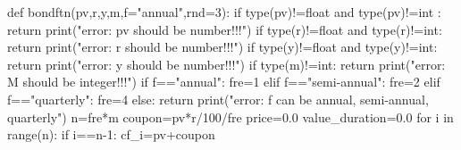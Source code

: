 \documentclass[
  letterpaper,
  DIV=11,
  numbers=noendperiod]{scrreprt}
\newenvironment{Shaded}{\begin{snugshade}}{\end{snugshade}}
\newcommand{\BuiltInTok}[1]{\textcolor[rgb]{0.00,0.23,0.31}{#1}}
\newcommand{\ControlFlowTok}[1]{\textcolor[rgb]{0.00,0.23,0.31}{#1}}
\newcommand{\DecValTok}[1]{\textcolor[rgb]{0.68,0.00,0.00}{#1}}
\newcommand{\FloatTok}[1]{\textcolor[rgb]{0.68,0.00,0.00}{#1}}
\newcommand{\KeywordTok}[1]{\textcolor[rgb]{0.00,0.23,0.31}{#1}}
\newcommand{\NormalTok}[1]{\textcolor[rgb]{0.00,0.23,0.31}{#1}}
\newcommand{\OperatorTok}[1]{\textcolor[rgb]{0.37,0.37,0.37}{#1}}
\newcommand{\StringTok}[1]{\textcolor[rgb]{0.13,0.47,0.30}{#1}}
\begin{document}
\begin{Shaded}
\begin{Highlighting}[]
\KeywordTok{def}\NormalTok{ bondftn(pv,r,y,m,f}\OperatorTok{=}\StringTok{"annual"}\NormalTok{,rnd}\OperatorTok{=}\DecValTok{3}\NormalTok{):}
    \ControlFlowTok{if} \BuiltInTok{type}\NormalTok{(pv)}\OperatorTok{!=}\BuiltInTok{float} \KeywordTok{and} \BuiltInTok{type}\NormalTok{(pv)}\OperatorTok{!=}\BuiltInTok{int}\NormalTok{ : }\ControlFlowTok{return} \BuiltInTok{print}\NormalTok{(}\StringTok{"error: pv should be number!!!"}\NormalTok{)}
    \ControlFlowTok{if} \BuiltInTok{type}\NormalTok{(r)}\OperatorTok{!=}\BuiltInTok{float} \KeywordTok{and} \BuiltInTok{type}\NormalTok{(r)}\OperatorTok{!=}\BuiltInTok{int}\NormalTok{: }\ControlFlowTok{return} \BuiltInTok{print}\NormalTok{(}\StringTok{"error: r should be number!!!"}\NormalTok{)}
    \ControlFlowTok{if} \BuiltInTok{type}\NormalTok{(y)}\OperatorTok{!=}\BuiltInTok{float} \KeywordTok{and} \BuiltInTok{type}\NormalTok{(y)}\OperatorTok{!=}\BuiltInTok{int}\NormalTok{: }\ControlFlowTok{return} \BuiltInTok{print}\NormalTok{(}\StringTok{"error: y should be number!!!"}\NormalTok{)}
    \ControlFlowTok{if} \BuiltInTok{type}\NormalTok{(m)}\OperatorTok{!=}\BuiltInTok{int}\NormalTok{: }\ControlFlowTok{return} \BuiltInTok{print}\NormalTok{(}\StringTok{"error: M should be integer!!!"}\NormalTok{)}
    \ControlFlowTok{if}\NormalTok{ f}\OperatorTok{==}\StringTok{"annual"}\NormalTok{: fre}\OperatorTok{=}\DecValTok{1}
    \ControlFlowTok{elif}\NormalTok{ f}\OperatorTok{==}\StringTok{"semi{-}annual"}\NormalTok{: fre}\OperatorTok{=}\DecValTok{2}
    \ControlFlowTok{elif}\NormalTok{ f}\OperatorTok{==}\StringTok{"quarterly"}\NormalTok{: fre}\OperatorTok{=}\DecValTok{4}
    \ControlFlowTok{else}\NormalTok{: }\ControlFlowTok{return} \BuiltInTok{print}\NormalTok{(}\StringTok{"error: f can be \textquotesingle{}annual\textquotesingle{}, \textquotesingle{}semi{-}annual\textquotesingle{}, \textquotesingle{}quarterly\textquotesingle{}"}\NormalTok{)}
\NormalTok{    n}\OperatorTok{=}\NormalTok{fre}\OperatorTok{*}\NormalTok{m}
\NormalTok{    coupon}\OperatorTok{=}\NormalTok{pv}\OperatorTok{*}\NormalTok{r}\OperatorTok{/}\DecValTok{100}\OperatorTok{/}\NormalTok{fre}
\NormalTok{    price}\OperatorTok{=}\FloatTok{0.0}
\NormalTok{    value\_duration}\OperatorTok{=}\FloatTok{0.0}
    \ControlFlowTok{for}\NormalTok{ i }\KeywordTok{in} \BuiltInTok{range}\NormalTok{(n):}
        \ControlFlowTok{if}\NormalTok{ i}\OperatorTok{==}\NormalTok{n}\OperatorTok{{-}}\DecValTok{1}\NormalTok{: cf\_i}\OperatorTok{=}\NormalTok{pv}\OperatorTok{+}\NormalTok{coupon}

\end{Highlighting}
\end{Shaded}
\end{document}
